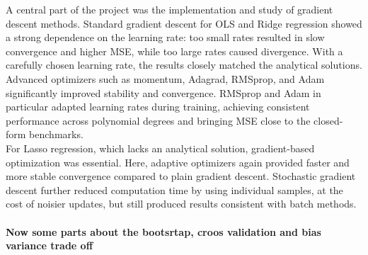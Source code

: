 \documentclass[
 reprint,            %
 amsmath,amssymb,
 aps,
]{revtex4-2}
\begin{document}
A central part of the project was the implementation and study of gradient descent methods.
Standard gradient descent for OLS and Ridge regression showed a strong dependence on the learning rate: too small rates resulted in slow convergence and higher MSE, while too large rates caused divergence.
With a carefully chosen learning rate, the results closely matched the analytical solutions.
Advanced optimizers such as momentum, Adagrad, RMSprop, and Adam significantly improved stability and convergence.
RMSprop and Adam in particular adapted learning rates during training, achieving consistent performance across polynomial degrees and bringing MSE close to the closed-form benchmarks.\\
For Lasso regression, which lacks an analytical solution, gradient-based optimization was essential.
Here, adaptive optimizers again provided faster and more stable convergence compared to plain gradient descent.
Stochastic gradient descent further reduced computation time by using individual samples, at the cost of noisier updates, but still produced results consistent with batch methods.\\\\

\textbf{Now some parts about the bootsrtap, croos validation and bias variance trade off}



\end{document}
